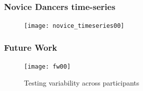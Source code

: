 \documentclass{beamer}
\begin{document}
 
\begin{frame}
\frametitle{Novice Dancers time-series}
\vspace{-0.7cm}


\begin{figure}[!htb]
\centering    
\texttt{[image: novice\_timeseries00]}
\caption[PA]{}
  
\label{fig:sn}
\end{figure}



\end{frame}


 
\begin{frame}
\frametitle{Future Work}
\vspace{-0.7cm}


\begin{figure}[!htb]
\centering    
\texttt{[image: fw00]}
\caption[PA]{Testing variability across participants  }
  
\label{fig:sn}
\end{figure}



\end{frame}



 
 
 
%  
%  
% 
% 
%     
% 
\end{document}
